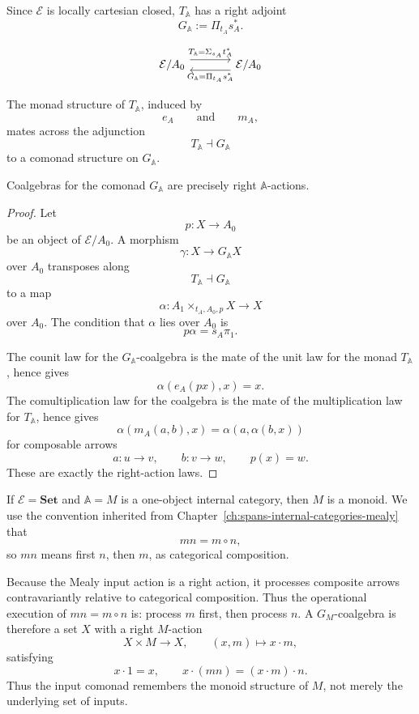 Since \(\mathcal E\) is locally cartesian closed, \(T_{\mathbb A}\) has a
right adjoint
\[
G_{\mathbb A}
:=
\Pi_{t_A}s_A^\ast.
\]

\[
\begin{tikzcd}[column sep=large]
\mathcal E/A_0
\arrow[r, shift left=1.1ex, "{T_{\mathbb A}=\Sigma_{s_A}t_A^\ast}"]
&
\mathcal E/A_0
\arrow[l, shift left=1.1ex, "{G_{\mathbb A}=\Pi_{t_A}s_A^\ast}"]
\end{tikzcd}
\]

The monad structure of \(T_{\mathbb A}\), induced by
\[
e_A
\qquad\text{and}\qquad
m_A,
\]
mates across the adjunction
\[
T_{\mathbb A}\dashv G_{\mathbb A}
\]
to a comonad structure on \(G_{\mathbb A}\).

\begin{proposition}
\label{prop:input-action-comonad-coalgebras}
Coalgebras for the comonad \(G_{\mathbb A}\) are precisely right
\(\mathbb A\)-actions.
\end{proposition}

\begin{proof}
Let
\[
p:X\to A_0
\]
be an object of \(\mathcal E/A_0\). A morphism
\[
\gamma:X\to G_{\mathbb A}X
\]
over \(A_0\) transposes along
\[
T_{\mathbb A}\dashv G_{\mathbb A}
\]
to a map
\[
\alpha:
A_1\times_{t_A,A_0,p}X\to X
\]
over \(A_0\). The condition that \(\alpha\) lies over \(A_0\) is
\[
p\alpha=s_A\pi_1.
\]

The counit law for the \(G_{\mathbb A}\)-coalgebra is the mate of the unit
law for the monad \(T_{\mathbb A}\), hence gives
\[
\alpha(e_A(px),x)=x.
\]
The comultiplication law for the coalgebra is the mate of the multiplication
law for \(T_{\mathbb A}\), hence gives
\[
\alpha(m_A(a,b),x)=\alpha(a,\alpha(b,x))
\]
for composable arrows
\[
a:u\to v,
\qquad
b:v\to w,
\qquad
p(x)=w.
\]
These are exactly the right-action laws.
\end{proof}

\begin{example}
\label{ex:input-action-comonad-one-object}
If \(\mathcal E=\mathbf{Set}\) and \(\mathbb A=M\) is a one-object internal
category, then \(M\) is a monoid. We use the convention inherited from
Chapter~\ref{ch:spans-internal-categories-mealy} that
\[
mn=m\circ n,
\]
so \(mn\) means first \(n\), then \(m\), as categorical composition.

Because the Mealy input action is a right action, it processes composite
arrows contravariantly relative to categorical composition. Thus the
operational execution of \(mn=m\circ n\) is: process \(m\) first, then process
\(n\). A \(G_M\)-coalgebra is therefore a set \(X\) with a right \(M\)-action
\[
X\times M\to X,
\qquad
(x,m)\mapsto x\cdot m,
\]
satisfying
\[
x\cdot 1=x,
\qquad
x\cdot(mn)=(x\cdot m)\cdot n.
\]
Thus the input comonad remembers the monoid structure of \(M\), not merely the
underlying set of inputs.
\end{example}


